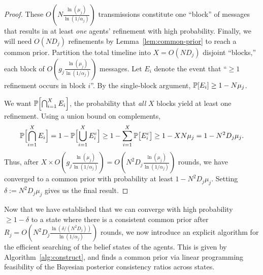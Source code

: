 \begin{proof}
These $O\left(N \frac{\ln\left(\mu_j\right)}{\ln\left(1/\alpha_j\right)}\right)$ transmissions constitute one ``block'' of messages that results in at least \emph{one} agents' refinement with high probability.
Finally, we will need $O(ND_j)$ refinements by Lemma~\ref{lem:common-prior} to reach a common prior.
Partition the total timeline into $X=O\left(N D_j\right)$ disjoint ``blocks,'' each block of $O\left(g_j\frac{\ln(\mu_j)}{\ln(1/\alpha_j)}\right)$ messages. 
Let $E_i$ denote the event that ``$\ge 1$ refinement occurs in block $i$''.  
By the single‐block argument, $\mathbb{P}[E_i]\ge 1 - N\mu_j$.

We want $\mathbb{P}\Bigl[\bigcap_{i=1}^X E_i\Bigr]$, the probability that \emph{all} $X$ blocks yield at least one refinement.
Using a union bound on complements,
\begin{equation*}
  \mathbb{P}\Bigl[\bigcap_{i=1}^X E_i\Bigr] = 1 - \mathbb{P}\Bigl[\bigcup_{i=1}^X E_i^c\Bigr] \ge 1 - \sum_{i=1}^X \mathbb{P}\bigl[E_i^c\bigr] \ge 1 - X N \mu_j = 1 - N^2 D_j\mu_j.
\end{equation*}
Thus, after $X\times O\left(g_j\frac{\ln(\mu_j)}{\ln(1/\alpha_j)}\right) = O\left(N^2 D_j\frac{\ln(\mu_j)}{\ln(1/\alpha_j)}\right)$
rounds, we have converged to a common prior with probability at least 
$1 - N^2 D_j\mu_j$.
Setting $\delta := N^2 D_j\mu_j$ gives us the final result.
\end{proof}

Now that we have established that we can converge with high probability $\ge 1 - \delta$ to a state where there is a consistent common prior after $R_j = O\left(N^2D_j\frac{\ln\left(\delta/(N^2D_j)\right)}{\ln\left(1/\alpha_j\right)}\right)$ rounds, we now introduce an explicit algorithm for the efficient searching of the belief states of the agents.
This is given by Algorithm~\ref{alg:construct}, and finds a common prior via linear programming feasibility of the Bayesian posterior consistency ratios across states.

